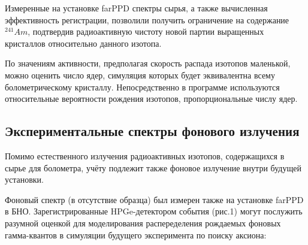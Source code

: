 \documentclass[a4paper,article,14pt]{extarticle}
\begin{document}
Измеренные на установке farPPD спектры сырья, а также вычисленная эффективность регистрации, позволили получить ограничение на содержание $^{241}Am$, подтвердив радиоактивную чистоту новой партии выращенных кристаллов относительно данного изотопа.

По значениям активности, предполагая скорость распада изотопов маленькой, можно оценить число ядер, симуляция которых будет эквивалентна всему болометрическому кристаллу. Непосредственно в программе используются относительные вероятности рождения изотопов, пропорциональные числу ядер.

\begin{table}[]
\centering
\caption{Активность нуклидов в образце и полное число событий за год, соответствующее данной активности}
\label{activity}
\end{table}
    
\subsection{Экспериментальные спектры фонового излучения}
    Помимо естественного излучения радиоактивных изотопов, содержащихся в сырье для болометра, учёту подлежит также фоновое излучение внутри будущей установки.
    
    Фоновый спектр (в отсутствие образца) был измерен также на установке farPPD в БНО. Зарегистрированные HPGe-детектором события (рис.1) могут послужить разумной оценкой для моделирования распеределения рождаемых фоновых гамма-квантов в симуляции будущего эксперимента по поиску аксиона:
    
\end{document}
